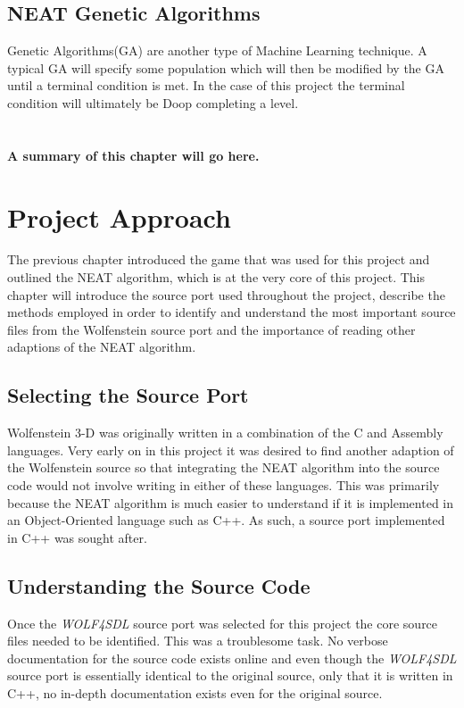 \documentclass[]{Learning-to-Play-Wolfenstein-thesis}
\begin{document}
\section{\label{section2.5}NEAT Genetic Algorithms}
Genetic Algorithms(GA) are another type of Machine Learning technique. A typical GA will specify some population which will then be modified by the GA until a terminal condition is met. In the case of this project the terminal condition will ultimately be Doop completing a level.\\\\\\\textbf{A summary of this chapter will go here.}


\chapter{\label{Chapter3}Project Approach}%
The previous chapter introduced the game that was used for this project and outlined the NEAT algorithm, which is at the very core of this project. This chapter will introduce the source port used throughout the project, describe the methods employed in order to identify and understand the most important source files from the Wolfenstein source port and the importance of reading other adaptions of the NEAT algorithm.

\section{Selecting the Source Port}
Wolfenstein 3-D was originally written in a combination of the C and Assembly languages. Very early on in this project it was desired to find another adaption of the Wolfenstein source so that integrating the NEAT algorithm into the source code would not involve writing in either of these languages. This was primarily because the NEAT algorithm is much easier to understand if it is implemented in an Object-Oriented language such as C++. As such, a source port implemented in C++ was sought after. 

\section{\label{section3.2}Understanding the Source Code}
Once the \textit{WOLF4SDL} source port was selected for this project the core source files needed to be identified. This was a troublesome task. No verbose documentation for the source code exists online and even though the \textit{WOLF4SDL} source port is essentially identical to the original source, only that it is written in C++, no in-depth documentation exists even for the original source. 
\end{document}
